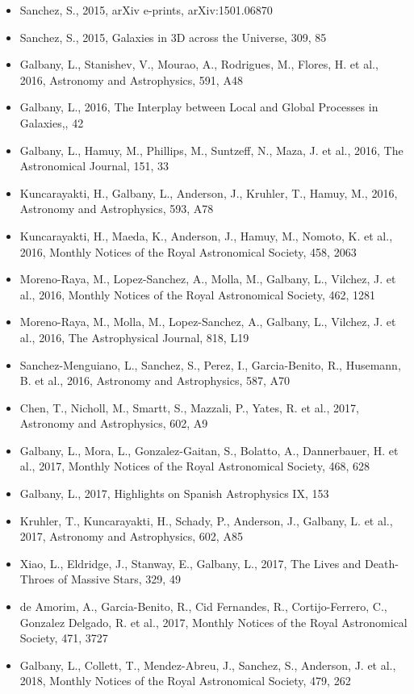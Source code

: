 \documentclass{letter}
\begin{document}
\begin{enumerate}
\begin{itemize}
\item Sanchez, S., 2015, arXiv e-prints, arXiv:1501.06870
\item Sanchez, S., 2015, Galaxies in 3D across the Universe, 309, 85
\item Galbany, L., Stanishev, V., Mourao, A., Rodrigues, M., Flores, H. et al., 2016, Astronomy and Astrophysics, 591, A48
\item Galbany, L., 2016, The Interplay between Local and Global Processes in Galaxies,, 42
\item Galbany, L., Hamuy, M., Phillips, M., Suntzeff, N., Maza, J. et al., 2016, The Astronomical Journal, 151, 33
\item Kuncarayakti, H., Galbany, L., Anderson, J., Kruhler, T., Hamuy, M., 2016, Astronomy and Astrophysics, 593, A78
\item Kuncarayakti, H., Maeda, K., Anderson, J., Hamuy, M., Nomoto, K. et al., 2016, Monthly Notices of the Royal Astronomical Society, 458, 2063
\item Moreno-Raya, M., Lopez-Sanchez, A., Molla, M., Galbany, L., Vilchez, J. et al., 2016, Monthly Notices of the Royal Astronomical Society, 462, 1281
\item Moreno-Raya, M., Molla, M., Lopez-Sanchez, A., Galbany, L., Vilchez, J. et al., 2016, The Astrophysical Journal, 818, L19
\item Sanchez-Menguiano, L., Sanchez, S., Perez, I., Garcia-Benito, R., Husemann, B. et al., 2016, Astronomy and Astrophysics, 587, A70
\item Chen, T., Nicholl, M., Smartt, S., Mazzali, P., Yates, R. et al., 2017, Astronomy and Astrophysics, 602, A9
\item Galbany, L., Mora, L., Gonzalez-Gaitan, S., Bolatto, A., Dannerbauer, H. et al., 2017, Monthly Notices of the Royal Astronomical Society, 468, 628
\item Galbany, L., 2017, Highlights on Spanish Astrophysics IX, 153
\item Kruhler, T., Kuncarayakti, H., Schady, P., Anderson, J., Galbany, L. et al., 2017, Astronomy and Astrophysics, 602, A85
\item Xiao, L., Eldridge, J., Stanway, E., Galbany, L., 2017, The Lives and Death-Throes of Massive Stars, 329, 49
\item de Amorim, A., Garcia-Benito, R., Cid Fernandes, R., Cortijo-Ferrero, C., Gonzalez Delgado, R. et al., 2017, Monthly Notices of the Royal Astronomical Society, 471, 3727
\item Galbany, L., Collett, T., Mendez-Abreu, J., Sanchez, S., Anderson, J. et al., 2018, Monthly Notices of the Royal Astronomical Society, 479, 262

\end{itemize}
\end{enumerate}
\end{document}
